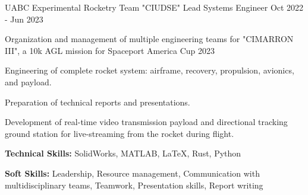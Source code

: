 \begin{cventries}
\end{cventries}




\begin{cventries}

  \cventry
    {UABC Experimental Rocketry Team "CIUDSE"} %
    {Lead Systems Engineer} %
    {} %
    {Oct 2022 - Jun 2023} %
    {
      \begin{cvitems} %
        \item {Organization and management of multiple engineering teams for "CIMARRON III", a 10k AGL mission for Spaceport America Cup 2023}
        \item {Engineering of complete rocket system: airframe, recovery, propulsion, avionics, and payload.}
        \item {Preparation of technical reports and presentations.}
        \item {Development of real-time video transmission payload and directional tracking ground station for live-streaming from the rocket during flight.}
        \item {\textbf{Technical Skills:} SolidWorks, MATLAB, LaTeX, Rust, Python}
        \item {\textbf{Soft Skills:} Leadership, Resource management, Communication with multidisciplinary teams, Teamwork, Presentation skills, Report writing}
      \end{cvitems}
    }


\end{cventries}
